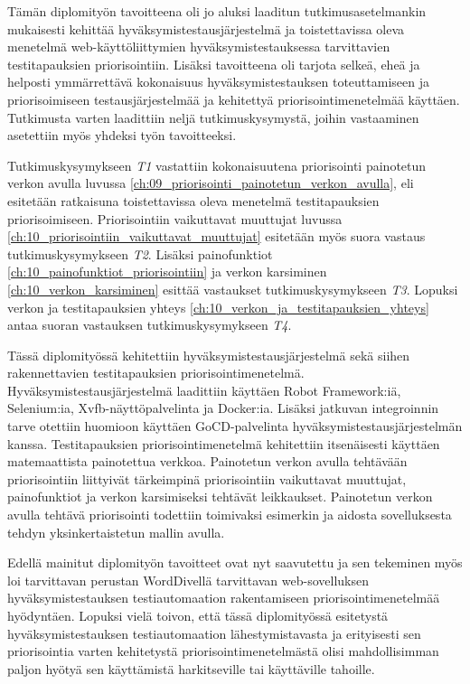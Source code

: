 Tämän diplomityön tavoitteena oli jo aluksi laaditun tutkimusasetelmankin mukaisesti kehittää hyväksymistestausjärjestelmä ja toistettavissa oleva menetelmä web-käyttöliittymien hyväksymistestauksessa tarvittavien testitapauksien priorisointiin.
Lisäksi tavoitteena oli tarjota selkeä, eheä ja helposti ymmärrettävä kokonaisuus hyväksymistestauksen toteuttamiseen ja priorisoimiseen testausjärjestelmää ja kehitettyä priorisointimenetelmää käyttäen.
Tutkimusta varten laadittiin neljä tutkimuskysymystä, joihin vastaaminen asetettiin myös yhdeksi työn tavoitteeksi.

Tutkimuskysymykseen \emph{T1} vastattiin kokonaisuutena priorisointi painotetun verkon avulla luvussa \ref{ch:09_priorisointi_painotetun_verkon_avulla}, eli esitetään ratkaisuna toistettavissa oleva menetelmä testitapauksien priorisoimiseen.
Priorisointiin vaikuttavat muuttujat luvussa \ref{ch:10_priorisointiin_vaikuttavat_muuttujat} esitetään myös suora vastaus tutkimuskysymykseen \emph{T2}.
Lisäksi painofunktiot \ref{ch:10_painofunktiot_priorisointiin} ja verkon karsiminen \ref{ch:10_verkon_karsiminen} esittää vastaukset tutkimuskysymykseen \emph{T3}.
Lopuksi verkon ja testitapauksien yhteys \ref{ch:10_verkon_ja_testitapauksien_yhteys} antaa suoran vastauksen tutkimuskysymykseen \emph{T4}.

Tässä diplomityössä kehitettiin hyväksymistestausjärjestelmä sekä siihen rakennettavien testitapauksien priorisointimenetelmä.
Hyväksymistestausjärjestelmä laadittiin käyttäen Robot Framework:iä, Selenium:ia, Xvfb-näyttöpalvelinta ja Docker:ia.
Lisäksi jatkuvan integroinnin tarve otettiin huomioon käyttäen GoCD-palvelinta hyväksymistestausjärjestelmän kanssa.
Testitapauksien priorisointimenetelmä kehitettiin itsenäisesti käyttäen matemaattista painotettua verkkoa.
Painotetun verkon avulla tehtävään priorisointiin liittyivät tärkeimpinä priorisointiin vaikuttavat muuttujat, painofunktiot ja verkon karsimiseksi tehtävät leikkaukset.
Painotetun verkon avulla tehtävä priorisointi todettiin toimivaksi esimerkin ja aidosta sovelluksesta tehdyn yksinkertaistetun mallin avulla.

Edellä mainitut diplomityön tavoitteet ovat nyt saavutettu ja sen tekeminen myös loi tarvittavan perustan WordDivellä tarvittavan web-sovelluksen hyväksymistestauksen testiautomaation rakentamiseen priorisointimenetelmää hyödyntäen.
Lopuksi vielä toivon, että tässä diplomityössä esitetystä hyväksymistestauksen testiautomaation lähestymistavasta ja erityisesti sen priorisointia varten kehitetystä priorisointimenetelmästä olisi mahdollisimman paljon hyötyä sen käyttämistä harkitseville tai käyttäville tahoille.